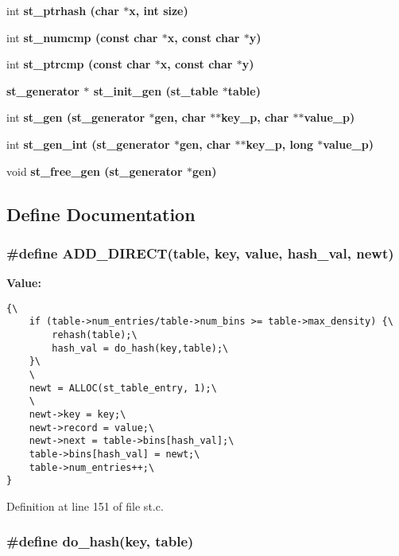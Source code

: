 \begin{CompactItemize}
int \bf{st\_\-ptrhash} (char $\ast$x, int \bf{size})
\item 
int \bf{st\_\-numcmp} (const char $\ast$x, const char $\ast$y)
\item 
int \bf{st\_\-ptrcmp} (const char $\ast$x, const char $\ast$y)
\item 
\bf{st\_\-generator} $\ast$ \bf{st\_\-init\_\-gen} (\bf{st\_\-table} $\ast$table)
\item 
int \bf{st\_\-gen} (\bf{st\_\-generator} $\ast$gen, char $\ast$$\ast$key\_\-p, char $\ast$$\ast$value\_\-p)
\item 
int \bf{st\_\-gen\_\-int} (\bf{st\_\-generator} $\ast$gen, char $\ast$$\ast$key\_\-p, long $\ast$value\_\-p)
\item 
void \bf{st\_\-free\_\-gen} (\bf{st\_\-generator} $\ast$gen)
\end{CompactItemize}


\subsection{Define Documentation}
\subsubsection{\setlength{\rightskip}{0pt plus 5cm}\#define ADD\_\-DIRECT(table, key, value, hash\_\-val, newt)}\label{st_8c_956d9dcd99d68ab4503789312b72c29a}


\textbf{Value:}

\begin{Code}\begin{verbatim}{\
    if (table->num_entries/table->num_bins >= table->max_density) {\
        rehash(table);\
        hash_val = do_hash(key,table);\
    }\
    \
    newt = ALLOC(st_table_entry, 1);\
    \
    newt->key = key;\
    newt->record = value;\
    newt->next = table->bins[hash_val];\
    table->bins[hash_val] = newt;\
    table->num_entries++;\
}
\end{verbatim}\end{Code}


Definition at line 151 of file st.c.
\subsubsection{\setlength{\rightskip}{0pt plus 5cm}\#define do\_\-hash(key, table)}\label{st_8c_8719b25fa2e849ad268f0bb382bae21c}


